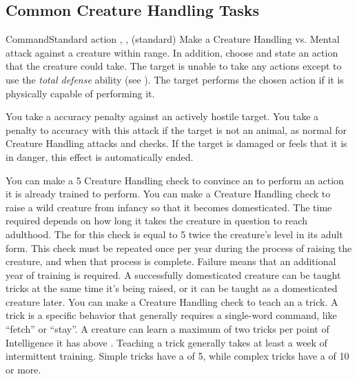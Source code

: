   \subsection{Common Creature Handling Tasks}

    \begin{sustainability}{Command}{Standard action}
      \abilitytags {}, ,  (standard)
      \rankline
      Make a Creature Handling vs. Mental attack against a creature within \rngmed range.
      In addition, choose and state an action that the creature could take.
      \hit The target is unable to take any actions except to use the \textit{total defense} ability (see ).
      \crit The target performs the chosen action if it is physically capable of performing it.

      You take a  accuracy penalty against an actively hostile target.
      You take a  penalty to accuracy with this attack if the target is not an animal, as normal for Creature Handling attacks and checks.
      If the target is damaged or feels that it is in danger, this effect is automatically ended.
    \end{sustainability}
     You can make a  5 Creature Handling check to convince an  to perform an action it is already trained to perform.
     You can make a Creature Handling check to raise a wild creature from infancy so that it becomes domesticated.
    The time required depends on how long it takes the creature in question to reach adulthood.
    The  for this check is equal to 5 \add twice the creature's level in its adult form.
    This check must be repeated once per year during the process of raising the creature, and when that process is complete.
    Failure means that an additional year of training is required.
    A successfully domesticated creature can be taught tricks at the same time it's being raised, or it can be taught as a domesticated creature later.
     You can make a Creature Handling check to teach an  a trick.
    A trick is a specific behavior that generally requires a single-word command, like ``fetch'' or ``stay''.
    A creature can learn a maximum of two tricks per point of Intelligence it has above .
    Teaching a trick generally takes at least a week of intermittent training.
    Simple tricks have a  of 5, while complex tricks have a  of 10 or more.

